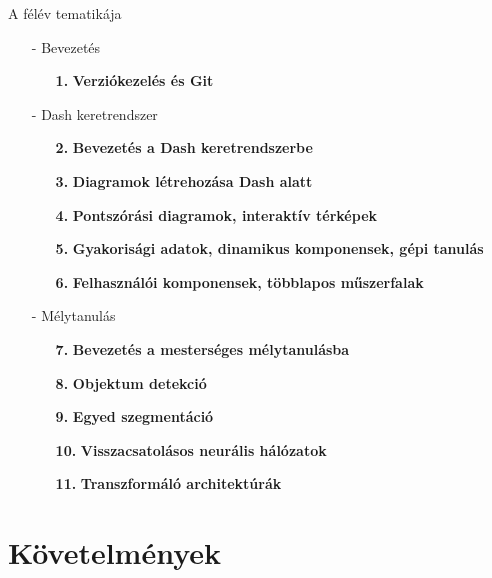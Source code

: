 \documentclass[english, aspectratio=169]{beamer}
\makeatletter
\let\origtableofcontents=\tableofcontents
\def\tableofcontents{\@ifnextchar[{\origtableofcontents}{\gobbletableofcontents}}
\def\gobbletableofcontents#1{\origtableofcontents}
\makeatother
\begin{document}
\begin{frame}{A félév tematikája}

\begin{itemize}
	\item[-] Bevezetés
	\begin{itemize}
		\item[\textbf{1.}] \textbf{Verziókezelés és Git}
	\end{itemize}
	\item[-] Dash keretrendszer
	\begin{itemize}
		\item[\textbf{2.}] \textbf{Bevezetés a Dash keretrendszerbe}
		\item[\textbf{3.}] \textbf{Diagramok létrehozása Dash alatt}
		\item[\textbf{4.}] \textbf{Pontszórási diagramok, interaktív térképek}
		\item[\textbf{5.}] \textbf{Gyakorisági adatok, dinamikus komponensek, gépi tanulás}
		\item[\textbf{6.}] \textbf{Felhasználói komponensek, többlapos műszerfalak}
	\end{itemize}
	\item[-] Mélytanulás
	\begin{itemize}
		\item[\textbf{7.}] \textbf{Bevezetés a mesterséges mélytanulásba}
		\item[\textbf{8.}] \textbf{Objektum detekció}
		\item[\textbf{9.}] \textbf{Egyed szegmentáció}
		\item[\textbf{10.}] \textbf{Visszacsatolásos neurális hálózatok}
		\item[\textbf{11.}] \textbf{Transzformáló architektúrák}
	\end{itemize}
\end{itemize}
	
\end{frame}

\section{Követelmények}

\begin{frame}{}
	\tableofcontents[currentsection]
\end{frame}
\end{document}
